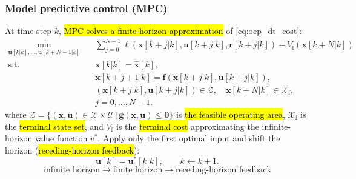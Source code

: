 \begin{frame}
	\frametitle{Model predictive control (MPC)}
	At time step $k$, \hl{MPC solves a finite-horizon approximation} of \eqref{eq:ocp_dt_cost}:
	\begin{equation}
		\begin{aligned}
			\min_{\bm{u}[k|k], \ldots, \bm{u}[k+N-1|k]}\quad
			 & \sum_{j=0}^{N-1}\ell(\bm{x}[k+j|k],\bm{u}[k+j|k],\bm{r}[k+j|k])
			+V_\mathrm{f}(\bm{x}[k+N|k])                                       \\
			\mathrm{s.t.}\quad
			 & \bm{x}[k|k]=\hat{\bm{x}}[k],                                    \\
			 & \bm{x}[k+j+1|k]=\bm{f}(\bm{x}[k+j|k],\bm{u}[k+j|k]),            \\
			 & (\bm{x}[k+j|k],\bm{u}[k+j|k])\in\mathcal{Z},\quad
			\bm{x}[k+N|k]\in\mathcal{X}_\mathrm{f},                            \\
			 & j=0,\ldots,N-1 .
		\end{aligned}
		\label{eq:mpc_ocp}
	\end{equation}
	where $\mathcal{Z}=\{(\bm{x},\bm{u})\in\mathcal{X}\times\mathcal{U}\,|\,\bm{g}(\bm{x},\bm{u})\leq\bm{0}\}$ is \hl{the feasible operating area}, $\mathcal{X}_\mathrm{f}$ is the \hl{terminal state  set}, and $V_\mathrm{f}$ is the \hl{terminal cost} approximating the infinite-horizon value function $v^*$.  \pause  Apply only the first optimal input and shift the horizon (\hl{receding-horizon feedback}):
	\begin{equation}
		\bm{u}[k]=\bm{u}^*[k|k],
		\qquad
		k\leftarrow k+1 .
		\label{eq:mpc_receding_horizon}
	\end{equation}\pause
	\begin{equation*}
		\boxed{
			\text{infinite horizon}\rightarrow
			\text{finite horizon}\rightarrow
			\text{receding-horizon feedback}}
	\end{equation*}
\end{frame}

